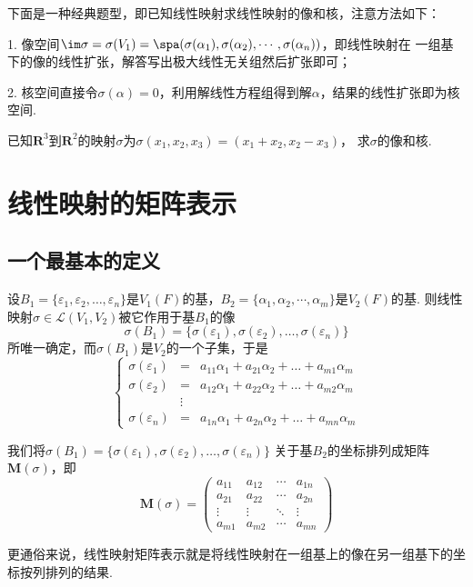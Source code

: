 下面是一种经典题型，即已知线性映射求线性映射的像和核，注意方法如下：

1. 像空间$\im \sigma=\sigma(V_1)=\spa(\sigma(\alpha_1),\sigma(\alpha_2),\cdots,\sigma(\alpha_n))$，即线性映射在
一组基下的像的线性扩张，解答写出极大线性无关组然后扩张即可；

2. 核空间直接令$\sigma(\alpha)=0$，利用解线性方程组得到解$\alpha$，结果的线性扩张即为核空间.
\begin{example}
    已知$\mathbf{R}^3$到$\mathbf{R}^2$的映射$\sigma$为$\sigma(x_1,x_2,x_3)=(x_1+x_2,x_2-x_3)$，
    求$\sigma$的像和核.
\end{example}

\section{线性映射的矩阵表示}
\subsection{一个最基本的定义}
\begin{definition}
    设$B_1=\{\varepsilon_1,\varepsilon_2,\ldots,\varepsilon_n\}$是$V_1(F)$的基，$B_2=\{\alpha_1,\alpha_2,\cdots,\alpha_m\}$是$V_2(F)$的基.
    则线性映射$\sigma \in \mathcal{L}(V_1,V_2)$被它作用于基$B_1$的像
    \[\sigma(B_1)=\{\sigma(\varepsilon_1),\sigma(\varepsilon_2),\ldots,\sigma(\varepsilon_n)\}\]
    所唯一确定，而$\sigma(B_1)$是$V_2$的一个子集，于是
    \[ \left\{
     \begin{array}{rcl}
        \sigma(\varepsilon_1)&=&a_{11}\alpha_1+a_{21}\alpha_2+\ldots+a_{m1}\alpha_m \\
        \sigma(\varepsilon_2)&=&a_{12}\alpha_1+a_{22}\alpha_2+\ldots+a_{m2}\alpha_m \\
        &\vdots& \\
        \sigma(\varepsilon_n)&=&a_{1n}\alpha_1+a_{2n}\alpha_2+\ldots+a_{mn}\alpha_m
     \end{array}
    \right. \]

    我们将$\sigma(B_1)=\{\sigma(\varepsilon_1),\sigma(\varepsilon_2),\ldots,\sigma(\varepsilon_n)\}$
    关于基$B_2$的坐标排列成矩阵$\mathbf{M}(\sigma)$，即
    \[\mathbf{M}(\sigma)=\begin{pmatrix}
        a_{11} & a_{12} & \cdots & a_{1n} \\
        a_{21} & a_{22} & \cdots & a_{2n} \\
        \vdots & \vdots & \ddots & \vdots \\
        a_{m1} & a_{m2} & \cdots & a_{mn}
    \end{pmatrix}\]
\end{definition}
更通俗来说，线性映射矩阵表示就是将线性映射在一组基上的像在另一组基下的坐标按列排列的结果.

